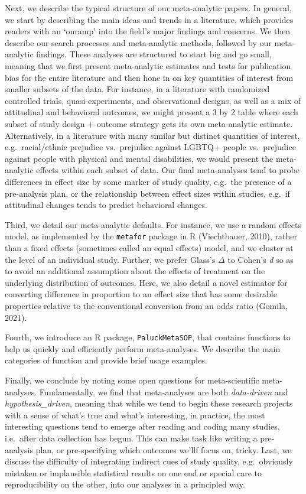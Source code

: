 \documentclass[
  man]{apa6}
\begin{document}
Next, we describe the typical structure of our meta-analytic papers. In general, we start by describing the main ideas and trends in a literature, which provides readers with an `onramp' into the field's major findings and concerns. We then describe our search processes and meta-analytic methods, followed by our meta-analytic findings. These analyses are structured to start big and go small, meaning that we first present meta-analytic estimates and tests for publication bias for the entire literature and then hone in on key quantities of interest from smaller subsets of the data. For instance, in a literature with randomized controlled trials, quasi-experiments, and observational designs, as well as a mix of attitudinal and behavioral outcomes, we might present a 3 by 2 table where each subset of study design + outcome strategy gets its own meta-analytic estimate. Alternatively, in a literature with many similar but distinct quantities of interest, e.g.~racial/ethnic prejudice vs.~prejudice against LGBTQ+ people vs.~prejudice against people with physical and mental disabilities, we would present the meta-analytic effects within each subset of data. Our final meta-analyses tend to probe differences in effect size by some marker of study quality, e.g.~the presence of a pre-analysis plan, or the relationship between effect sizes within studies, e.g.~if attitudinal changes tends to predict behavioral changes.

Third, we detail our meta-analytic defaults. For instance, we use a random effects model, as implemented by the \texttt{metafor} package in R (Viechtbauer, 2010), rather than a fixed effects (sometimes called an equal effects) model, and we cluster at the level of an individual study. Further, we prefer Glass's \(\Delta\) to Cohen's \emph{d} so as to avoid an additional assumption about the effects of treatment on the underlying distribution of outcomes. Here, we also detail a novel estimator for converting difference in proportion to an effect size that has some desirable properties relative to the conventional conversion from an odds ratio (Gomila, 2021).

Fourth, we introduce an R package, \texttt{PaluckMetaSOP}, that contains functions to help us quickly and efficiently perform meta-analyses. We describe the main categories of function and provide brief usage examples.

Finally, we conclude by noting some open questions for meta-scientific meta-analyses. Fundamentally, we find that meta-analyses are both \emph{data-driven} and \emph{hypothesis\_driven}, meaning that while we tend to begin these research projects with a sense of what's true and what's interesting, in practice, the most interesting questions tend to emerge after reading and coding many studies, i.e.~after data collection has begun. This can make task like writing a pre-analysis plan, or pre-specifying which outcomes we'llf focus on, tricky. Last, we discuss the difficulty of integrating indirect cues of study quality, e.g.~obviously mistaken or implausible statistical results on one end or special care to reproducibility on the other, into our analyses in a principled way.
\end{document}

